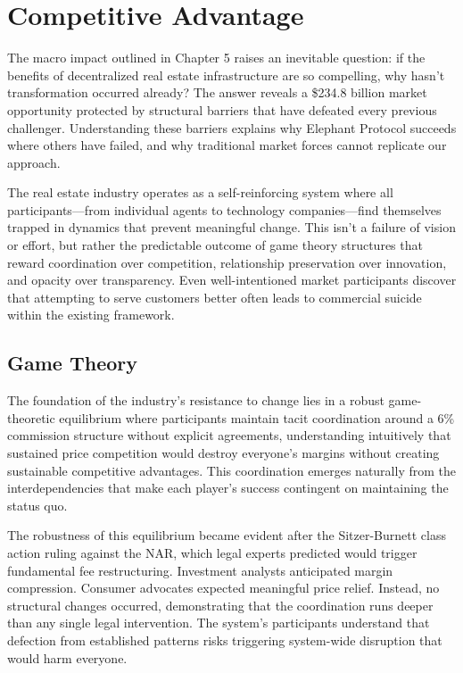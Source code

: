 \chapter{Competitive Advantage}

The macro impact outlined in Chapter 5 raises an inevitable question: if the benefits of decentralized real estate infrastructure are so compelling, why hasn't transformation occurred already? The answer reveals a \$234.8 billion market opportunity protected by structural barriers that have defeated every previous challenger. Understanding these barriers explains why Elephant Protocol succeeds where others have failed, and why traditional market forces cannot replicate our approach.

The real estate industry operates as a self-reinforcing system where all participants---from individual agents to technology companies---find themselves trapped in dynamics that prevent meaningful change. This isn't a failure of vision or effort, but rather the predictable outcome of game theory structures that reward coordination over competition, relationship preservation over innovation, and opacity over transparency. Even well-intentioned market participants discover that attempting to serve customers better often leads to commercial suicide within the existing framework.

\section{Game Theory}

The foundation of the industry's resistance to change lies in a robust game-theoretic equilibrium where participants maintain tacit coordination around a 6\% commission structure without explicit agreements, understanding intuitively that sustained price competition would destroy everyone's margins without creating sustainable competitive advantages. This coordination emerges naturally from the interdependencies that make each player's success contingent on maintaining the status quo.

The robustness of this equilibrium became evident after the Sitzer-Burnett class action ruling against the NAR, which legal experts predicted would trigger fundamental fee restructuring. Investment analysts anticipated margin compression. Consumer advocates expected meaningful price relief. Instead, no structural changes occurred, demonstrating that the coordination runs deeper than any single legal intervention. The system's participants understand that defection from established patterns risks triggering system-wide disruption that would harm everyone.

